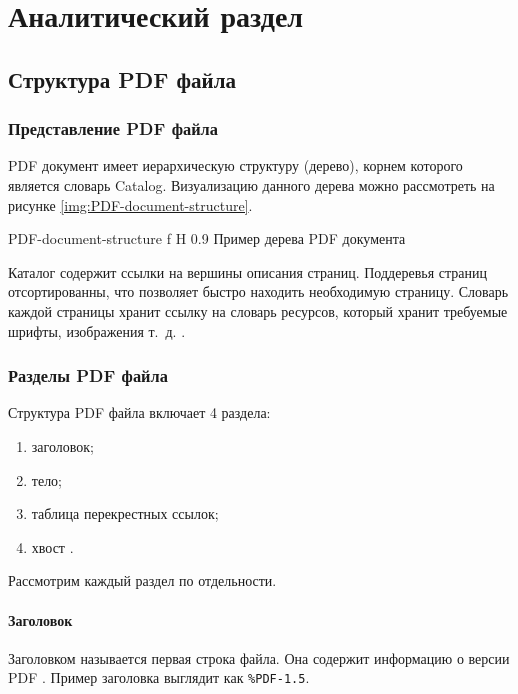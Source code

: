 \chapter{Аналитический раздел}

\section{Структура PDF файла}
\subsection{Представление PDF файла}
PDF документ имеет иерархическую структуру (дерево), корнем которого является словарь
Catalog. Визуализацию данного дерева можно рассмотреть на рисунке \ref{img:PDF-document-structure}.


{PDF-document-structure} %
{f} %
{H} %
{0.9\textwidth} %
{Пример дерева PDF документа} %

Каталог содержит ссылки на вершины описания страниц. Поддеревья страниц отсортированны, что позволяет быстро находить необходимую страницу.
Словарь каждой страницы хранит ссылку на словарь ресурсов, который хранит требуемые шрифты, изображения т.~д. \cite{pdf_object_def}.



\subsection{Разделы PDF файла}
Структура PDF файла включает 4 раздела:
\begin{enumerate}
	\item заголовок;
	\item тело;
	\item таблица перекрестных ссылок;
	\item хвост \cite{pdf_object_def}.
\end{enumerate}
Рассмотрим каждый раздел по отдельности.
\subsubsection{Заголовок}
Заголовком называется первая строка файла. Она содержит информацию о версии PDF \cite{pdf_object_def}. Пример заголовка выглядит как \texttt{\%PDF-1.5}.


